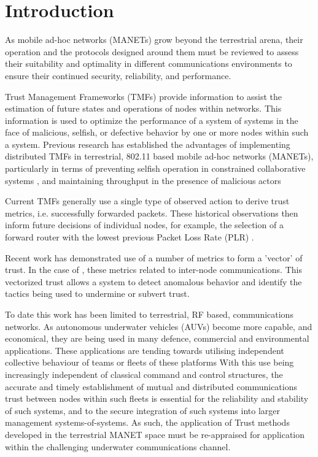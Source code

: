 \documentclass[runningheads,a4paper]{llncs}
\begin{document}
\section{Introduction}\label{sec:introduction}

As mobile ad-hoc networks (MANETs) grow beyond the terrestrial arena, their operation and the protocols designed around them must be reviewed to assess their suitability and optimality in different communications environments to ensure their continued security, reliability, and performance.

Trust Management Frameworks (TMFs) provide information to assist the estimation of future states and operations of nodes within networks.
This information is used to optimize the performance of a system of systems in the face of malicious, selfish, or defective behavior by one or more nodes within such a system.
Previous research has established the advantages of implementing distributed TMFs in terrestrial, 802.11 based mobile ad-hoc networks (MANETs), particularly in terms of preventing selfish operation in constrained collaborative systems \cite{Li2007}, and maintaining throughput in the presence of malicious actors \cite{Buchegger2002}

Current TMFs generally use a single type of observed action to derive trust metrics, i.e. successfully forwarded packets. These historical observations then inform future decisions of individual nodes, for example, the selection of a forward router with the lowest previous Packet Loss Rate (PLR) \cite{Li2008}.

Recent work has demonstrated use of a number of metrics to form a 'vector’ of trust.
In the case of \cite{Guo2012}, these metrics related to inter-node communications.
This vectorized trust allows a system to detect anomalous behavior and identify the tactics being used to undermine or subvert trust.

To date this work has been limited to terrestrial, RF based, communications networks.
As autonomous underwater vehicles (AUVs) become more capable, and economical, they are being used in many defence, commercial and environmental applications.
These applications are tending towards utilising  independent collective behaviour of teams or fleets of these platforms \cite{Caiti2011}
With this use being increasingly independent of classical command and control structures, the accurate and timely establishment of mutual and distributed communications trust between nodes within such fleets is essential for the reliability and stability of such systems, and to the secure integration of such systems into larger management systems-of-systems.
As such, the application of Trust methods developed in the terrestrial MANET space must be re-appraised for application within the challenging underwater communications channel.
\end{document}

